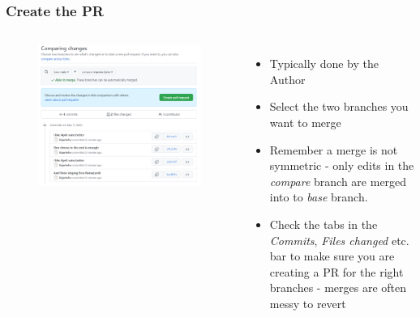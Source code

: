 \documentclass[aspectratio=169]{beamer} %
\begin{document}
\begin{frame}
	\frametitle{Create the PR}
	\begin{columns}[c]
		
		\vspace{-.75cm}
		\begin{figure}
			\centering
			\includegraphics[width=\textwidth]{./img/create-pr-0.png}
		\end{figure}
		
		\begin{itemize}
			\setlength\itemsep{1em}
			\item Typically done by the Author		
			\item Select the two branches you want to merge
			\item Remember a merge is not symmetric 
			- only edits in the \textit{compare} branch are merged into to \textit{base} branch.
			\item Check the tabs in the \textit{Commits}, \textit{Files changed} etc. bar
			to make sure you are creating a PR for the right branches - merges are often messy to revert
		\end{itemize}
		
	\end{columns}
\end{frame}
\end{document}
